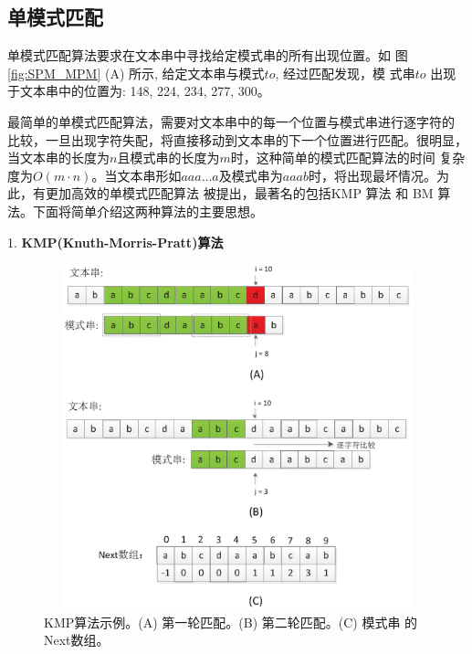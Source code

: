 \subsection{单模式匹配}

单模式匹配算法要求在文本串中寻找给定模式串的所有出现位置。如
图 \ref{fig:SPM_MPM} (A) 所示, 给定文本串与模式$to$, 经过匹配发现，模
式串$to$ 出现于文本串中的位置为: 148, 224, 234, 277, 300。

最简单的单模式匹配算法，需要对文本串中的每一个位置与模式串进行逐字符的
比较，一旦出现字符失配，将直接移动到文本串的下一个位置进行匹配。很明显，
当文本串的长度为$n$且模式串的长度为$m$时，这种简单的模式匹配算法的时间
复杂度为$O(m \cdot
n)$。当文本串形如$aaa \dots
a$及模式串为$aaab$时，将出现最坏情况。为此，有更加高效的单模式匹配算法
被提出，最著名的包括KMP \cite{Knuth1977}算法 和 BM \cite{Boyer1977} 算
法。下面将简单介绍这两种算法的主要思想。

1. \textbf{KMP(Knuth-Morris-Pratt)算法}

\begin{figure}[H]
  \centering
  \includegraphics[height=10cm ,width=12cm]{figures/1_Introduction/KMP.eps}
  \caption{KMP算法示例。(A) 第一轮匹配。(B) 第二轮匹配。(C) 模式串
    的Next数组。}
  \label{fig:KMP}
\end{figure}

